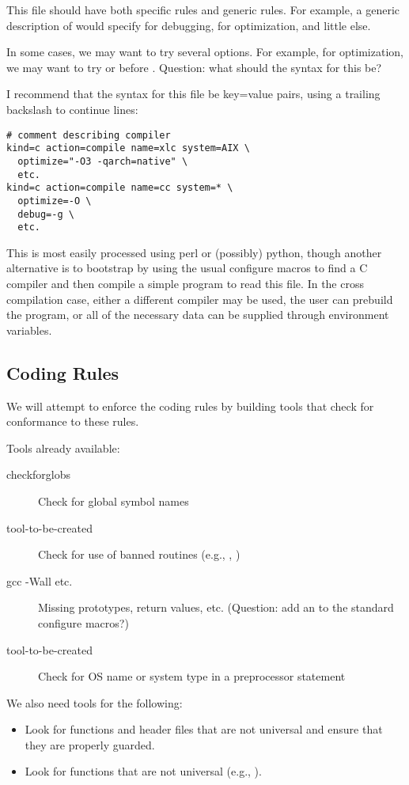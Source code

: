 \documentclass{article}
\begin{document}
This file should have both specific rules and generic rules.  For
example, a generic description of  would specify 
for debugging,  for optimization, and little else.  

In some cases, we may want to try several options.  For example, for
optimization, we may want to try  or  before .
Question:
what should the syntax for this be?

I recommend that the syntax for this file be key=value pairs, using a
trailing backslash to continue lines:
\begin{verbatim}
# comment describing compiler
kind=c action=compile name=xlc system=AIX \
  optimize="-O3 -qarch=native" \
  etc.
kind=c action=compile name=cc system=* \
  optimize=-O \
  debug=-g \
  etc.
\end{verbatim}
This is most easily processed using perl or (possibly) python, though
another alternative is to bootstrap by using the usual configure
macros to find a C compiler and then compile a simple program to read
this file.  In the cross compilation case, either a different compiler
may be used, the user can prebuild the program, or all of the
necessary data can be supplied through environment variables.

\subsection{Coding Rules}
We will attempt to enforce the coding rules by building tools that
check for conformance to these rules.

Tools already available:
\begin{description}
\item[checkforglobs]Check for global symbol names
\item[tool-to-be-created]Check for use of banned routines (e.g., ,
)
\item[gcc -Wall etc.]Missing prototypes, return values,
etc. (Question: add an  to the standard
configure macros?)
\item[tool-to-be-created]Check for OS name or system type in a preprocessor
  statement 
\end{description}

We also need tools for the following:
\begin{itemize}
\item Look for functions and header files that are not universal and
ensure that they are properly guarded.
\item Look for functions that are not universal (e.g., ).
\end{itemize}
\end{document}
